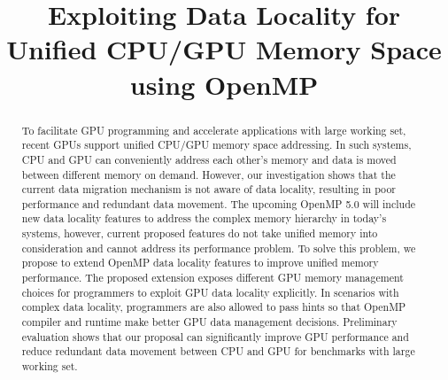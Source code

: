 \documentclass[sigconf]{acmart}
\begin{document}
\title{Exploiting Data Locality for Unified CPU/GPU Memory Space using OpenMP}




\begin{abstract}

To facilitate GPU programming and accelerate applications with large working set, recent GPUs support unified CPU/GPU memory space addressing.
In such systems, CPU and GPU can conveniently address each other's memory and data is moved between different memory on demand.
However, our investigation shows that the current data migration mechanism is not aware of data locality, resulting in poor performance and redundant data movement.
The upcoming OpenMP 5.0 will include new data locality features to address the complex memory hierarchy in today's systems, however, current proposed features do not take unified memory into consideration and cannot address its performance problem.
To solve this problem, we propose to extend OpenMP data locality features to improve unified memory performance.
The proposed extension exposes different GPU memory management choices for programmers to exploit GPU data locality explicitly.
In scenarios with complex data locality, programmers are also allowed to pass hints so that OpenMP compiler and runtime make better GPU data management decisions.
Preliminary evaluation shows that our proposal can significantly improve GPU performance and reduce redundant data movement between CPU and GPU for benchmarks with large working set.



\end{abstract}
\end{document}
